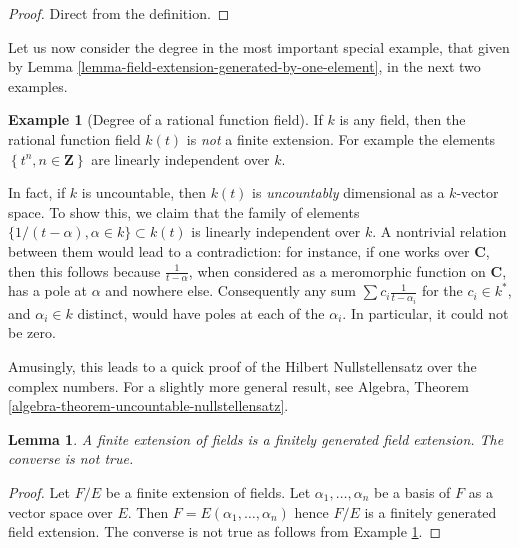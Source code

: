 \documentclass{stacks-project}
\theoremstyle{plain}
\newtheorem{lemma}[subsection]{Lemma}
\theoremstyle{definition}
\newtheorem{example}[subsection]{Example}
\theoremstyle{remark}
\numberwithin{equation}{subsection}
\begin{document}
\begin{proof}
Direct from the definition.
\end{proof}

\noindent
Let us now consider the degree in the most important special example, that
given by Lemma \ref{lemma-field-extension-generated-by-one-element}, in the
next two examples.

\begin{example}[Degree of a rational function field]
\label{example-degree-rational-function-field}
If $k$ is any field, then the rational function field $k(t)$ is
{\it not} a finite extension. For example the elements
$\left\{t^n, n \in \mathbf{Z}\right\}$ are linearly independent over $k$.

\medskip\noindent
In fact, if $k$ is uncountable, then $k(t)$ is {\it uncountably} dimensional
as a $k$-vector space. To show this, we claim that the family of elements
$\{1/(t- \alpha), \alpha \in k\} \subset k(t)$ is linearly independent over
$k$. A nontrivial relation between them would lead to a contradiction: for
instance, if one works over $\mathbf{C}$, then this follows because
$\frac{1}{t-\alpha}$, when considered as a meromorphic function on
$\mathbf{C}$, has a pole at $\alpha$ and nowhere else.
Consequently any sum $\sum c_i \frac{1}{t - \alpha_i}$ for the $c_i \in k^*$,
and $\alpha_i \in k$ distinct, would have poles at each of the $\alpha_i$.
In particular, it could not be zero.

\medskip\noindent
Amusingly, this leads to a quick proof of the Hilbert Nullstellensatz over
the complex numbers. For a slightly more general result, see
Algebra, Theorem \ref{algebra-theorem-uncountable-nullstellensatz}.
\end{example}

\begin{lemma}
\label{lemma-finite-finitely-generated}
A finite extension of fields is a finitely generated field extension.
The converse is not true.
\end{lemma}

\begin{proof}
Let $F/E$ be a finite extension of fields. Let $\alpha_1, \ldots, \alpha_n$
be a basis of $F$ as a vector space over $E$. Then
$F = E(\alpha_1, \ldots, \alpha_n)$ hence $F/E$ is a finitely generated
field extension. The converse is not true as follows from
Example \ref{example-degree-rational-function-field}.
\end{proof}
\end{document}
